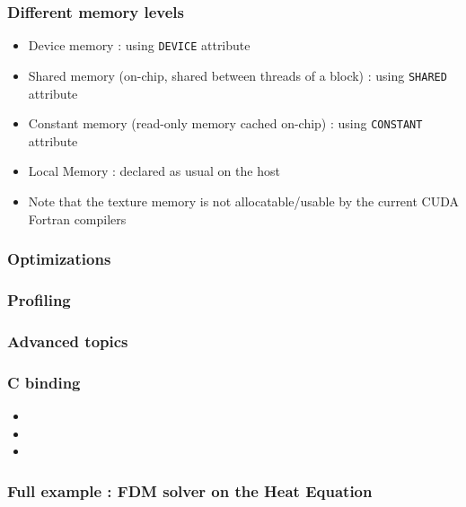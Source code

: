 \begin{frame}[containsverbatim]
	\frametitle{Different memory levels}
	\begin{itemize}
	\item {Device memory  : using \texttt{DEVICE} attribute}
	\item {Shared memory (on-chip, shared between threads of a block) : using \texttt{SHARED} attribute}
	\item {Constant memory (read-only memory cached on-chip) : using \texttt{CONSTANT} attribute}
	\item {Local Memory : declared as usual on the host}
	\item {Note that the texture memory is not allocatable/usable by the current CUDA Fortran compilers}
	\end{itemize}
\end{frame}




\subsubsection{Optimizations}


\subsubsection{Profiling}


\subsubsection{Advanced topics}

\begin{frame}[containsverbatim]
	\frametitle{C binding}
	\begin{itemize}
	\item {}
	\item {}
	\item {}
	\end{itemize}
\end{frame}



\subsubsection{Full example : FDM solver on the Heat Equation}









